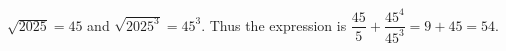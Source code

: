 $\sqrt{2025}=45$ and $\sqrt{2025^3}=45^3$. Thus the expression is $\dfrac{45}{5}+\dfrac{45^4}{45^3}=9+45=\boxed{54}$.
